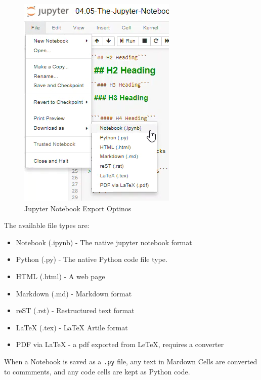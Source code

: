 \documentclass{book}
\makeatletter
\def\maxwidth{\ifdim\Gin@nat@width>\linewidth\linewidth
    \else\Gin@nat@width\fi}
\let\Oldincludegraphics\includegraphics
\renewcommand{\includegraphics}[1]{\Oldincludegraphics[width=.8\maxwidth]{#1}}
\providecommand{\tightlist}{%
      \setlength{\itemsep}{0pt}\setlength{\parskip}{0pt}}
\makeatother
\begin{document}
\begin{figure}
\centering
\includegraphics{images/jupyter_notebook_export_options.png}
\caption{Jupyter Notebook Export Optinos}
\end{figure}

The available file types are:

\begin{itemize}
\tightlist
\item
  Notebook (.ipynb) - The native jupyter notebook format
\item
  Python (.py) - The native Python code file type.
\item
  HTML (.html) - A web page
\item
  Markdown (.md) - Markdown format
\item
  reST (.rst) - Restructured text format
\item
  LaTeX (.tex) - LaTeX Artile format
\item
  PDF via LaTeX - a pdf exported from LeTeX, requires a converter
\end{itemize}

When a Notebook is saved as a \lstinline!.py! file, any text in Mardown
Cells are converted to commments, and any code cells are kept as Python
code.
\end{document}
